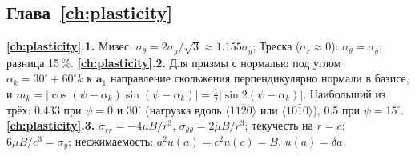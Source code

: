\subsection*{Глава~\ref{ch:plasticity}}
\textbf{\ref{ch:plasticity}.1.} Мизес: $\sigma_\theta = 2\sigma_y/\sqrt3\approx1.155\sigma_y$; Треска ($\sigma_r\approx0$): $\sigma_\theta = \sigma_y$; разница 15\,\%.
\textbf{\ref{ch:plasticity}.2.} Для призмы с нормалью под углом $\alpha_k = 30^\circ + 60^\circ k$ к $\mathbf a_1$ направление скольжения
перпендикулярно нормали в базисе, и $m_k = |\cos(\psi - \alpha_k)\sin(\psi - \alpha_k)| = \tfrac12|\sin2(\psi - \alpha_k)|$. Наибольший из трёх:
0.433 при $\psi = 0$ и $30^\circ$ (нагрузка вдоль $\langle11\bar20\rangle$ или $\langle10\bar10\rangle$), 0.5 при $\psi = 15^\circ$.
\textbf{\ref{ch:plasticity}.3.} $\sigma_{rr} = -4\mu B/r^3$, $\sigma_{\theta\theta} = 2\mu B/r^3$; текучесть на $r = c$: $6\mu B/c^3 = \sigma_y$;
несжимаемость: $a^2u(a) = c^2u(c) = B$, $u(a) = \delta a$.
